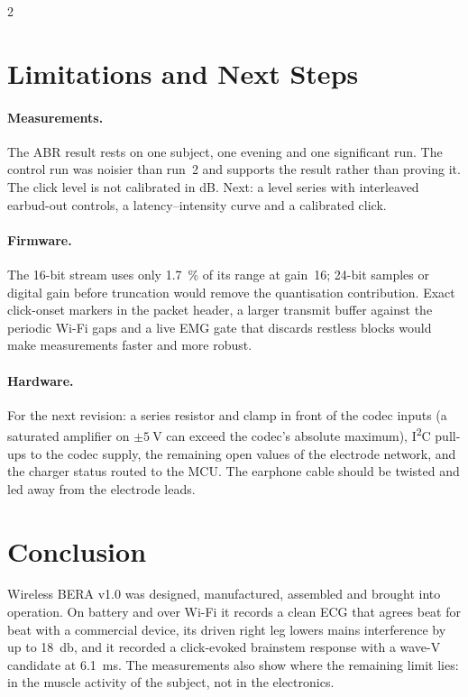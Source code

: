 \documentclass[
	a4paper,english
]{MFETechnicalReport}
\begin{document}
\begin{multicols}{2}
\section{Limitations and Next Steps}

\paragraph{Measurements.} The ABR result rests on one subject, one evening and one significant run. The control run was noisier than run~2 and supports the result rather than proving it. The click level is not calibrated in dB. Next: a level series with interleaved earbud-out controls, a latency--intensity curve and a calibrated click.

\paragraph{Firmware.} The 16-bit stream uses only \SI{1.7}{\percent} of its range at gain~16; 24-bit samples or digital gain before truncation would remove the quantisation contribution. Exact click-onset markers in the packet header, a larger transmit buffer against the periodic Wi-Fi gaps and a live EMG gate that discards restless blocks would make measurements faster and more robust.

\paragraph{Hardware.} For the next revision: a series resistor and clamp in front of the codec inputs (a saturated amplifier on $\pm\SI{5}{\volt}$ can exceed the codec's absolute maximum), I\textsuperscript{2}C pull-ups to the codec supply, the remaining open values of the electrode network, and the charger status routed to the MCU. The earphone cable should be twisted and led away from the electrode leads.

\section{Conclusion}

Wireless BERA v1.0 was designed, manufactured, assembled and brought into operation. On battery and over Wi-Fi it records a clean ECG that agrees beat for beat with a commercial device, its driven right leg lowers mains interference by up to \SI{18}{\decibel}, and it recorded a click-evoked brainstem response with a wave-V candidate at \SI{6.1}{\milli\second}. The measurements also show where the remaining limit lies: in the muscle activity of the subject, not in the electronics.


\end{multicols}
\end{document}
